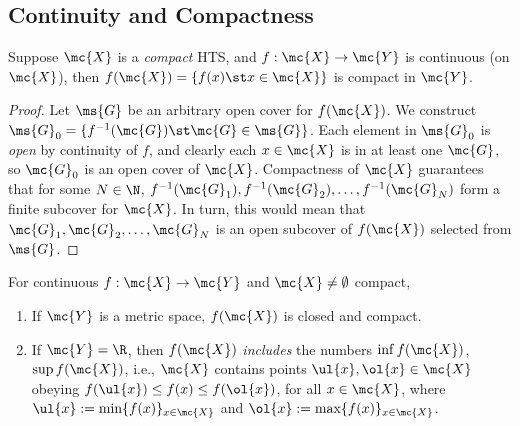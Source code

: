 \subsection{Continuity and Compactness}
\begin{ntheorem}{}
	Suppose \(\mc{X}\) is a \emph{compact} HTS, and \(f:\mc{X}\to\mc{Y}\) is continuous (on \(\mc{X}\)), then \(f(\mc{X})=\{f(x)\st x\in\mc{X}\}\) is compact in \(\mc{Y}\).
\end{ntheorem}
\begin{proof}
	Let \(\ms{G}\) be an arbitrary open cover for \(f(\mc{X})\). We construct \(\ms{G}_0=\{f^{-1}(\mc{G})\st \mc{G}\in\ms{G}\}\). Each element in \(\ms{G}_0\) is \emph{open} by continuity of \(f\), and clearly each \(x\in\mc{X}\) is in at least one \(\mc{G}\), so \(\mc{G}_0\) is an open cover of \(\mc{X}\). Compactness of \(\mc{X}\) guarantees that for some \(N\in\N\), \(f^{-1}(\mc{G}_1),f^{-1}(\mc{G}_2),\dots, f^{-1}(\mc{G}_N)\) form a finite subcover for \(\mc{X}\). In turn, this would mean that \(\mc{G}_1,\mc{G}_2,\dots,\mc{G}_N\) is an open subcover of \(f(\mc{X})\) selected from \(\ms{G}\). 
\end{proof}
\begin{note}[Consequences]
	For continuous \(f:\mc{X}\to\mc{Y}\) and \(\mc{X}\neq\emptyset\) compact, 
	\begin{enumerate}[(1)]
		\item If \(\mc{Y}\) is a metric space, \(f(\mc{X})\) is closed and compact.
		
		\item If \(\mc{Y}=\R\), then \(f(\mc{X})\) \emph{includes} the numbers \(\inf{f(\mc{X})}\), \(\sup{f(\mc{X})}\), i.e., \(\mc{X}\) contains points \(\ul{x},\ol{x}\in\mc{X}\) obeying \(f(\ul{x})\leq f(x)\leq f(\ol{x})\), for all \(x\in\mc{X}\), where \(\ul{x}:=\text{min}\{f(x)\}_{x\in\mc{X}}\) and \(\ol{x}:=\text{max}\{f(x)\}_{x\in\mc{X}}\).
	\end{enumerate}
\end{note}

